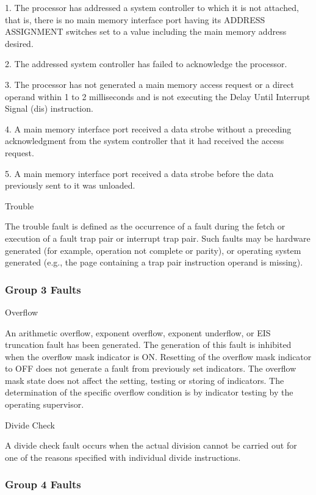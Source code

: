 1. The processor has addressed a system controller to which it is not attached,
that is, there is no main memory interface port having its ADDRESS ASSIGNMENT
switches set to a value including the main memory address desired.

2. The addressed system controller has failed to acknowledge the processor.

3. The processor has not generated a main memory access request or a direct
operand within 1 to 2 milliseconds and is not executing the Delay Until
Interrupt Signal (dis) instruction.

4. A main memory interface port received a data strobe without a preceding
acknowledgment from the system controller that it had received the access
request.

5. A main memory interface port received a data strobe before the data
previously sent to it was unloaded.

Trouble

The trouble fault is defined as the occurrence of a fault during the fetch or
execution of a fault trap pair or interrupt trap pair. Such faults may be
hardware generated (for example, operation not complete or parity), or
operating system generated (e.g., the page containing a trap pair instruction
operand is missing).  

\subsubsection{Group 3 Faults}

Overflow

An arithmetic overflow, exponent overflow, exponent underflow, or EIS
truncation fault has been generated. The generation of this fault is inhibited
when the overflow mask indicator is ON. Resetting of the overflow mask
indicator to OFF does not generate a fault from previously set indicators. The
overflow mask state does not affect the setting, testing or storing of
indicators. The determination of the specific overflow condition is by
indicator testing by the operating supervisor.

Divide Check

A divide check fault occurs when the actual division cannot be carried out for
one of the reasons specified with individual divide instructions.  

\subsubsection{Group 4 Faults}

